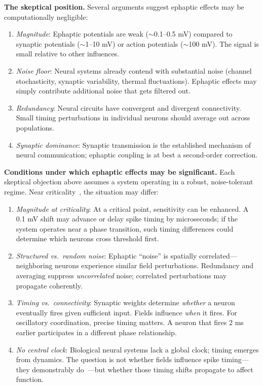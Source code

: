 \documentclass[12pt]{article}
\begin{document}
\textbf{The skeptical position.} Several arguments suggest ephaptic effects may be computationally negligible:
\begin{enumerate}
\item \emph{Magnitude}: Ephaptic potentials are weak ($\sim$0.1--0.5 mV) compared to synaptic potentials ($\sim$1--10 mV) or action potentials ($\sim$100 mV). The signal is small relative to other influences.
\item \emph{Noise floor}: Neural systems already contend with substantial noise (channel stochasticity, synaptic variability, thermal fluctuations). Ephaptic effects may simply contribute additional noise that gets filtered out.
\item \emph{Redundancy}: Neural circuits have convergent and divergent connectivity. Small timing perturbations in individual neurons should average out across populations.
\item \emph{Synaptic dominance}: Synaptic transmission is the established mechanism of neural communication; ephaptic coupling is at best a second-order correction.
\end{enumerate}

\textbf{Conditions under which ephaptic effects may be significant.} Each skeptical objection above assumes a system operating in a robust, noise-tolerant regime. Near criticality~\cite{beggs2003,shew2013}, the situation may differ:
\begin{enumerate}
\item \emph{Magnitude at criticality}: At a critical point, sensitivity can be enhanced. A 0.1 mV shift may advance or delay spike timing by microseconds; if the system operates near a phase transition, such timing differences could determine which neurons cross threshold first.
\item \emph{Structured vs.\ random noise}: Ephaptic ``noise'' is spatially correlated---neighboring neurons experience similar field perturbations. Redundancy and averaging suppress \emph{uncorrelated} noise; correlated perturbations may propagate coherently.
\item \emph{Timing vs.\ connectivity}: Synaptic weights determine \emph{whether} a neuron eventually fires given sufficient input. Fields influence \emph{when} it fires. For oscillatory coordination, precise timing matters. A neuron that fires 2 ms earlier participates in a different phase relationship.
\item \emph{No central clock}: Biological neural systems lack a global clock; timing emerges from dynamics. The question is not whether fields influence spike timing---they demonstrably do~\cite{anastassiou2011}---but whether those timing shifts propagate to affect function.
\end{enumerate}
\end{document}
